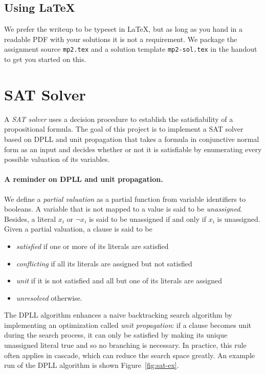\documentclass[11pt]{article}
\begin{document}
\subsection*{Using LaTeX}

We prefer the writeup to be typeset in LaTeX,
but as long as you hand in a readable PDF with your solutions it is
not a requirement.  We package the assignment source
\texttt{mp2.tex} and a solution template \texttt{mp2-sol.tex} in
the handout to get you started on this.

\clearpage
\section{SAT Solver}

A \emph{SAT solver} uses a decision procedure to establish the satisfiability of a propositional formula. The goal of this project is to implement a SAT solver based on DPLL and unit propagation that takes a formula in conjunctive normal form as an input and decides whether or not it is satisfiable by enumerating every possible valuation of its variables. 


\paragraph{A reminder on DPLL and unit propagation.}

We define a \emph{partial valuation} as a {partial} function from variable identifiers
to booleans. A variable that is not mapped to a value is said to be \emph{unassigned}.
Besides, a literal $x_i$ or $\neg x_i$ is said to be {unassigned} if and only if $x_i$ is unassigned. Given a partial valuation, a clause is said to be

\begin{itemize}
\setlength\itemsep{0.1em}
\item \emph{satisfied} if one or more of its literals are satisfied
\item \emph{conflicting} if all its literals are assigned but not satisfied
\item \emph{unit} if it is not satisfied and all but one of its literals are assigned
\item \emph{unresolved} otherwise.
\end{itemize}

\noindent The {DPLL} algorithm enhances a naive backtracking search algorithm
by implementing an optimization called \emph{unit propagation}: if a clause
becomes unit during the search process, it can only be satisfied by making its unique
unassigned literal true and so no branching is necessary. In practice, this rule
often applies in cascade, which can reduce the search space greatly. An example run
of the {DPLL} algorithm is shown Figure~\ref{fig:sat-ex}.
\end{document}
